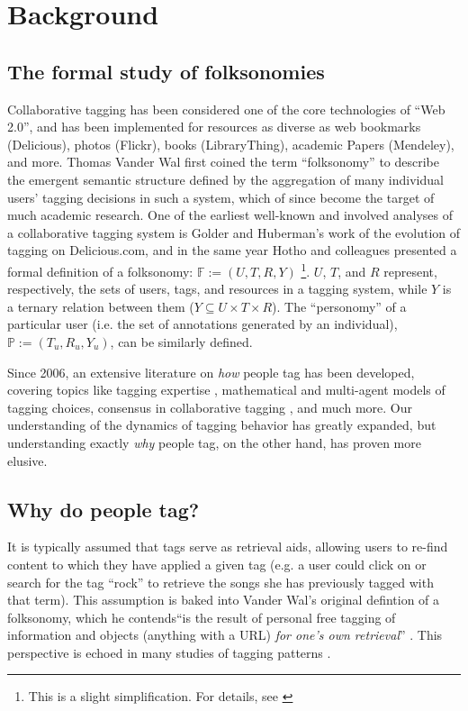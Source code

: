 \section{Background}
\label{sec_related}

\subsection{The formal study of folksonomies}
Collaborative tagging has been considered one of the core technologies of ``Web 2.0'', and has been implemented for resources as diverse as web bookmarks (Delicious), photos (Flickr), books (LibraryThing), academic Papers (Mendeley), and more. Thomas Vander Wal \cite{VanderWal2007} first coined the term ``folksonomy'' to describe the emergent semantic structure defined by the aggregation of many individual users' tagging decisions in such a system, which of since become the target of much academic research. One of the earliest well-known and involved analyses of a collaborative tagging system is Golder and Huberman's \cite{Golder2006} work of the evolution of tagging on Delicious.com, and in the same year Hotho and colleagues \cite{Hotho2006a} presented a formal definition of a folksonomy: $\mathbb{F} := (U,T,R,Y)$ \footnote{This is a slight simplification. For details, see \cite{Hotho2006a}}. $U$, $T$, and $R$ represent, respectively, the sets of users, tags, and resources in a tagging system, while $Y$ is a ternary relation between them ($Y \subseteq U \times T \times R$). The ``personomy'' of a particular user (i.e. the set of annotations generated by an individual),  $\mathbb{P} := (T_{u},R_{u},Y_{u})$, can be similarly defined.

Since 2006, an extensive literature on \emph{how} people tag has been developed, covering topics like tagging expertise \cite{Yeung2011},	mathematical \cite{Cattuto2007a} and multi-agent \cite{Lorince2013} models of tagging choices, consensus in collaborative tagging \cite{Halpin2007,Robu2009}, and much more. Our understanding of the dynamics of tagging behavior has greatly expanded, but understanding exactly \emph{why} people tag, on the other hand, has proven more elusive.

\subsection{Why do people tag?}
It is typically assumed that tags serve as retrieval aids, allowing users to re-find content to which they have applied a given tag (e.g. a user could click on or search for the tag ``rock'' to retrieve the songs she has previously tagged with that term). This assumption is baked into Vander Wal's original defintion of a folksonomy, which he contends``is the result of personal free tagging of information and objects (anything with a URL) \emph{for one's own retrieval}'' \cite[emphasis added]{VanderWal2007}. This perspective is echoed in many studies of tagging patterns \cite{Glushko2008,Halpin2007,Golder2006}.

